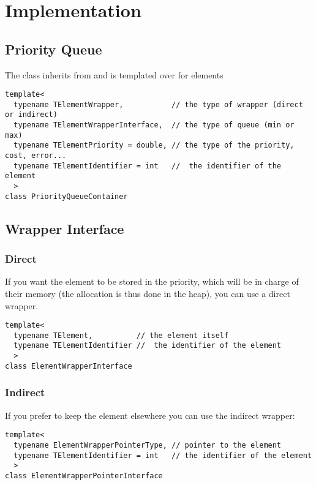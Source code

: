 \documentclass{InsightArticle}
\begin{document}
\tableofcontents

\section{ Implementation}
\subsection{Priority Queue}

The class  inherits from  and is templated over for elements
\begin{verbatim}
template<
  typename TElementWrapper,           // the type of wrapper (direct or indirect)
  typename TElementWrapperInterface,  // the type of queue (min or max)
  typename TElementPriority = double, // the type of the priority, cost, error...
  typename TElementIdentifier = int   //  the identifier of the element
  >
class PriorityQueueContainer
\end{verbatim}

\subsection{Wrapper Interface}

\subsubsection{Direct}

If you want the element to be stored in the priority, which will be in charge of their memory (the allocation is thus done in the heap), you can use a direct wrapper.

\begin{verbatim}
template<
  typename TElement,          // the element itself
  typename TElementIdentifier //  the identifier of the element
  >
class ElementWrapperInterface
\end{verbatim}

\subsubsection{Indirect}

If you prefer to keep the element elsewhere you can use the indirect wrapper:

\begin{verbatim}
template<
  typename ElementWrapperPointerType, // pointer to the element
  typename TElementIdentifier = int   // the identifier of the element
  >
class ElementWrapperPointerInterface
\end{verbatim}
\end{document}
